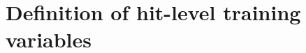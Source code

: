 \appendix
\chapter{Definition of hit-level training variables}
\label{appendix:hit-training-var}
\lipsum[1]
